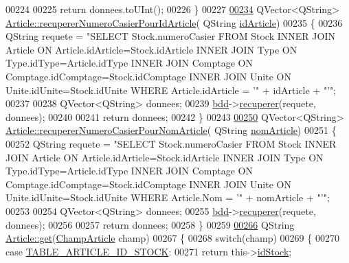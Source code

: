 \begin{DoxyCode}
00224 
00225     \textcolor{keywordflow}{return} donnees.toUInt();
00226 \}
00227 
\hyperlink{class_article_aa7aeaee7858b50714e9c022899b9b82d}{00234} QVector<QString> \hyperlink{class_article_aa7aeaee7858b50714e9c022899b9b82d}{Article::recupererNumeroCasierPourIdArticle}(
      QString \hyperlink{class_article_a9f2f7a04139f26accec145066a5aacae}{idArticle})
00235 \{
00236     QString requete = \textcolor{stringliteral}{"SELECT Stock.numeroCasier FROM Stock INNER JOIN Article ON
       Article.idArticle=Stock.idArticle INNER JOIN Type ON Type.idType=Article.idType INNER JOIN Comptage ON
       Comptage.idComptage=Stock.idComptage INNER JOIN Unite ON Unite.idUnite=Stock.idUnite WHERE Article.idArticle = '"} + idArticle + \textcolor{stringliteral}{"'"};
00237 
00238     QVector<QString> donnees;
00239     \hyperlink{class_article_a7221cec4212d86d74f479b9ee683ee8a}{bdd}->\hyperlink{class_bdd_a8f25d29d309041bbf875700db0efd97b}{recuperer}(requete, donnees);
00240 
00241     \textcolor{keywordflow}{return} donnees;
00242 \}
00243 
\hyperlink{class_article_aa311f3d149340622383c418444aa65a4}{00250} QVector<QString> \hyperlink{class_article_aa311f3d149340622383c418444aa65a4}{Article::recupererNumeroCasierPourNomArticle}(
      QString \hyperlink{class_article_a0ba6c08f7dd54e4b7caf673ecd6b41a6}{nomArticle})
00251 \{
00252     QString requete = \textcolor{stringliteral}{"SELECT Stock.numeroCasier FROM Stock INNER JOIN Article ON
       Article.idArticle=Stock.idArticle INNER JOIN Type ON Type.idType=Article.idType INNER JOIN Comptage ON
       Comptage.idComptage=Stock.idComptage INNER JOIN Unite ON Unite.idUnite=Stock.idUnite WHERE Article.Nom = '"} + nomArticle + \textcolor{stringliteral}{"'"};
00253 
00254     QVector<QString> donnees;
00255     \hyperlink{class_article_a7221cec4212d86d74f479b9ee683ee8a}{bdd}->\hyperlink{class_bdd_a8f25d29d309041bbf875700db0efd97b}{recuperer}(requete, donnees);
00256 
00257     \textcolor{keywordflow}{return} donnees;
00258 \}
00259 
\hyperlink{class_article_a81e89d4821991a69277f3a0f8e88a001}{00266} QString \hyperlink{class_article_a81e89d4821991a69277f3a0f8e88a001}{Article::get}(\hyperlink{_article_8h_a159354683cfd6e1b578172fbe6490ab6}{ChampArticle} champ)
00267 \{
00268     \textcolor{keywordflow}{switch}(champ)
00269     \{
00270         \textcolor{keywordflow}{case} \hyperlink{_article_8h_a159354683cfd6e1b578172fbe6490ab6acfb8962aaa35363f43d27a9f6f1ae265}{TABLE\_ARTICLE\_ID\_STOCK}:
00271             \textcolor{keywordflow}{return} this->\hyperlink{class_article_afb7785930598d5fbdafb707acdd3eec1}{idStock};

\end{DoxyCode}
